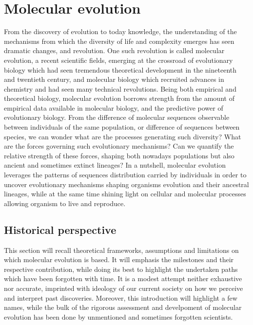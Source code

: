 \thispagestyle{empty}
\chapter{Molecular evolution}
{
	\hypersetup{linkcolor=GREYDARK}
	\minitoc
}

\label{sec:intro}

From the discovery of evolution to today knowledge, the understanding of the mechanisms from which the diversity of life and complexity emerges has seen dramatic changes, and revolution.
One such revolution is called molecular evolution, a recent scientific fields, emerging at the crossroad of evolutionary biology which had seen tremendous theoretical development in the nineteenth and twentieth century, and molecular biology which recruited advances in chemistry and had seen many technical revolutions.
Being both empirical and theoretical biology, molecular evolution borrows strength from the amount of empirical data available in molecular biology, and the predictive power of evolutionary biology.
From the difference of molecular sequences observable between individuals of the same population, or difference of sequences between species, we can wonder what are the processes generating such diversity?
What are the forces governing such evolutionary mechanisms?
Can we quantify the relative strength of these forces, shaping both nowadays populations but also ancient and sometimes extinct lineages?
In a nutshell, molecular evolution leverages the patterns of sequences distribution carried by individuals in order to uncover evolutionary mechanisms shaping organisms evolution and their ancestral lineages, while at the same time shining light on cellular and molecular processes allowing organism to live and reproduce.

\section{Historical perspective}

This section will recall theoretical frameworks, assumptions and limitations on which molecular evolution is based.
It will emphasis the milestones and their respective contribution, while doing its best to highlight the undertaken paths which have been forgotten with time.
It is a modest attempt neither exhaustive nor accurate, imprinted with ideology of our current society on how we perceive and interpret past discoveries. 
Moreover, this introduction will highlight a few names, while the bulk of the rigorous assessment and develpoment of molecular evolution has been done by unmentioned and sometimes forgotten scientists.

